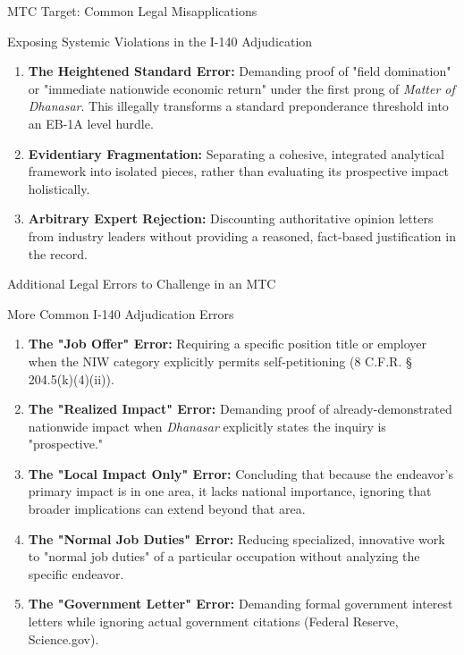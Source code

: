 \documentclass[11pt]{beamer}
\begin{document}
	\begin{frame}{MTC Target: Common Legal Misapplications}
		\scriptsize
		\begin{block}{Exposing Systemic Violations in the I-140 Adjudication}
			\begin{enumerate}
				\item \textbf{The Heightened Standard Error:} Demanding proof of "field domination" or "immediate nationwide economic return" under the first prong of \textit{Matter of Dhanasar}. This illegally transforms a standard preponderance threshold into an EB-1A level hurdle.
				\item \textbf{Evidentiary Fragmentation:} Separating a cohesive, integrated analytical framework into isolated pieces, rather than evaluating its prospective impact holistically.
				\item \textbf{Arbitrary Expert Rejection:} Discounting authoritative opinion letters from industry leaders without providing a reasoned, fact-based justification in the record.
			\end{enumerate}
		\end{block}
	\end{frame}
	
	\begin{frame}{Additional Legal Errors to Challenge in an MTC}
		\scriptsize
		\begin{block}{More Common I-140 Adjudication Errors}
			\begin{enumerate}
				\item \textbf{The "Job Offer" Error:} Requiring a specific position title or employer when the NIW category explicitly permits self-petitioning (8 C.F.R. § 204.5(k)(4)(ii)).
				\item \textbf{The "Realized Impact" Error:} Demanding proof of already-demonstrated nationwide impact when \textit{Dhanasar} explicitly states the inquiry is "prospective."
				\item \textbf{The "Local Impact Only" Error:} Concluding that because the endeavor's primary impact is in one area, it lacks national importance, ignoring that broader implications can extend beyond that area.
				\item \textbf{The "Normal Job Duties" Error:} Reducing specialized, innovative work to "normal job duties" of a particular occupation without analyzing the specific endeavor.
				\item \textbf{The "Government Letter" Error:} Demanding formal government interest letters while ignoring actual government citations (Federal Reserve, Science.gov).
			\end{enumerate}
		\end{block}
	\end{frame}
	
\end{document}
